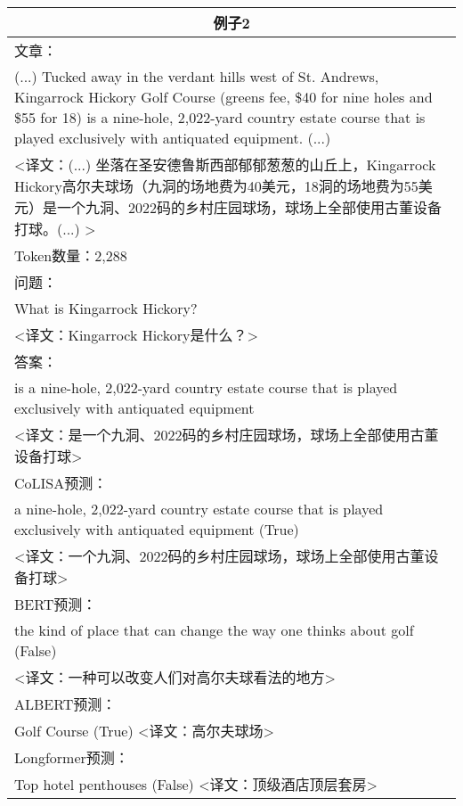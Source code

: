 \begin{table}[htbp]
\begin{tabular}{p{408pt}}
        \multicolumn{1}{c}{\bfseries 例子2} \\
        \hline
        文章：\\
        (...) Tucked away in the verdant hills west of St. Andrews, Kingarrock Hickory Golf Course (greens fee, \$40 for nine holes and \$55 for 18) \textcolor[rgb]{1,0,0.2}{is a nine-hole, 2,022-yard country estate course that is played exclusively with antiquated equipment}. (...) \\
        <译文：(...) 坐落在圣安德鲁斯西部郁郁葱葱的山丘上，Kingarrock Hickory高尔夫球场（九洞的场地费为40美元，18洞的场地费为55美元）是一个九洞、2022码的乡村庄园球场，球场上全部使用古董设备打球。(...) > \\
        \hline
        Token数量：2,288 \\
        \hline
        问题：\\
        What is Kingarrock Hickory? \\
        <译文：Kingarrock Hickory是什么？> \\
        \hline
        答案：\\
        is a nine-hole, 2,022-yard country estate course that is played exclusively with antiquated equipment \\
        <译文：是一个九洞、2022码的乡村庄园球场，球场上全部使用古董设备打球> \\
        \hline
        CoLISA预测：\\
        \textcolor[rgb]{1,0,0.2}{a nine-hole, 2,022-yard country estate course that is played exclusively with antiquated equipment} (True) \\
        <译文：一个九洞、2022码的乡村庄园球场，球场上全部使用古董设备打球> \\
        \hline
        BERT预测：\\
        the kind of place that can change the way one thinks about golf (False) \\
        <译文：一种可以改变人们对高尔夫球看法的地方> \\
        \hline
        ALBERT预测：\\
        Golf Course (True)
        <译文：高尔夫球场> \\
        \hline
        Longformer预测： \\
        Top hotel penthouses (False)
        <译文：顶级酒店顶层套房> \\
        \hline
    \end{tabular}
    \label{tab:3-2}
\end{table}
